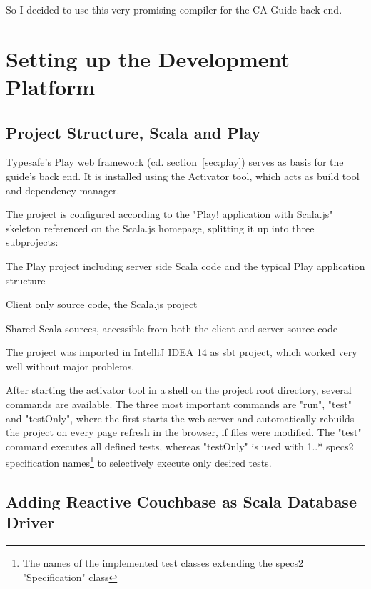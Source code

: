 So I decided to use this very promising compiler for the CA Guide back end.

\section{Setting up the Development Platform}

\subsection{Project Structure, Scala and Play}

Typesafe's Play web framework (cd. section~\ref{sec:play}) serves as basis for the guide's back end. It is installed using the Activator tool, which acts as build tool and dependency manager.
 
The project is configured according to the "Play! application with Scala.js" skeleton \cite{playscalajs} referenced on the Scala.js homepage, splitting it up into three subprojects:

\begin{description}[leftmargin=!,labelwidth=\widthof{\bfseries editor-server}]
\item[$\bullet$ editor-server] The Play project including server side Scala code and the typical Play application structure
\item[$\bullet$ editor-client] Client only source code, the Scala.js project
\item[$\bullet$ editor-shared] Shared Scala sources, accessible from both the client and server source code
\end{description} 
 
The project was imported in IntelliJ IDEA 14 as sbt project, which worked very well without major problems. 

After starting the activator tool in a shell on the project root directory, several commands are available. The three most important commands are "run", "test" and "testOnly", where the first starts the web server and automatically rebuilds the project on every page refresh in the browser, if files were modified. The "test" command executes all defined tests, whereas "testOnly" is used with 1..* specs2 \cite{specs2} specification names\footnote{The names of the implemented test classes extending the specs2 "Specification" class} to selectively execute only desired tests.

\subsection{Adding Reactive Couchbase as Scala Database Driver}

